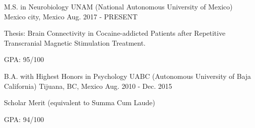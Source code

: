 \begin{cventries}
    \cventry
        {M.S. in Neurobiology}
        {UNAM (National Autonomous University of Mexico)}
        {Mexico city, Mexico}
        {Aug. 2017 - PRESENT}
        {
            \begin{cvitems}
                \item {Thesis: Brain Connectivity in Cocaine-addicted Patients after Repetitive Transcranial Magnetic Stimulation Treatment.}
                \item {GPA: 95/100}
            \end{cvitems}
        }
    \cventry
        {B.A. with Highest Honors in Psychology}
        {UABC (Autonomous University of Baja California)}
        {Tijuana, BC, Mexico}
        {Aug. 2010 - Dec. 2015}
        {
            \begin{cvitems}
                \item {Scholar Merit (equivalent to Summa Cum Laude)}
                \item {GPA: 94/100}
            \end{cvitems}
        }
\end{cventries}
